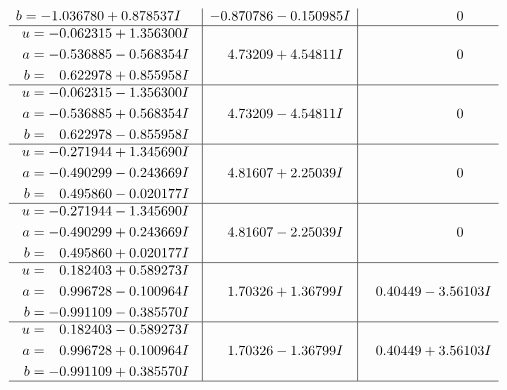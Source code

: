 \documentclass[1p]{elsarticle_modified}
\theoremstyle{definition}
\begin{document}
$$\begin{array}{c|c|c}
\begin{aligned}
b &= -1.036780 + 0.878537 I\end{aligned}
 & -0.870786 - 0.150985 I & \phantom{-0.000000 } 0 \\ \hline\begin{aligned}
u &= -0.062315 + 1.356300 I \\
a &= -0.536885 - 0.568354 I \\
b &= \phantom{-}0.622978 + 0.855958 I\end{aligned}
 & \phantom{-}4.73209 + 4.54811 I & \phantom{-0.000000 } 0 \\ \hline\begin{aligned}
u &= -0.062315 - 1.356300 I \\
a &= -0.536885 + 0.568354 I \\
b &= \phantom{-}0.622978 - 0.855958 I\end{aligned}
 & \phantom{-}4.73209 - 4.54811 I & \phantom{-0.000000 } 0 \\ \hline\begin{aligned}
u &= -0.271944 + 1.345690 I \\
a &= -0.490299 - 0.243669 I \\
b &= \phantom{-}0.495860 - 0.020177 I\end{aligned}
 & \phantom{-}4.81607 + 2.25039 I & \phantom{-0.000000 } 0 \\ \hline\begin{aligned}
u &= -0.271944 - 1.345690 I \\
a &= -0.490299 + 0.243669 I \\
b &= \phantom{-}0.495860 + 0.020177 I\end{aligned}
 & \phantom{-}4.81607 - 2.25039 I & \phantom{-0.000000 } 0 \\ \hline\begin{aligned}
u &= \phantom{-}0.182403 + 0.589273 I \\
a &= \phantom{-}0.996728 - 0.100964 I \\
b &= -0.991109 - 0.385570 I\end{aligned}
 & \phantom{-}1.70326 + 1.36799 I & \phantom{-}0.40449 - 3.56103 I \\ \hline\begin{aligned}
u &= \phantom{-}0.182403 - 0.589273 I \\
a &= \phantom{-}0.996728 + 0.100964 I \\
b &= -0.991109 + 0.385570 I\end{aligned}
 & \phantom{-}1.70326 - 1.36799 I & \phantom{-}0.40449 + 3.56103 I\\
 \hline 

\end{array}$$
\end{document}
